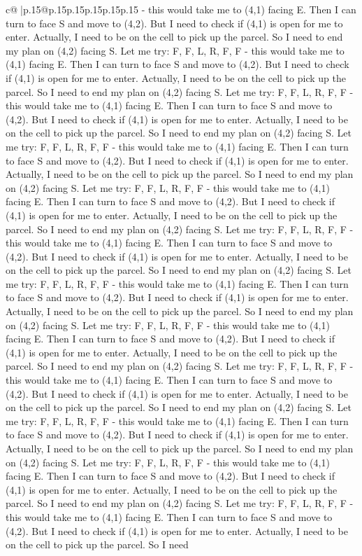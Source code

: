 \documentclass{article}
\begin{document}
{\begin{supertabular}{c@{$\;$}|p{.15\linewidth}@{}p{.15\linewidth}p{.15\linewidth}p{.15\linewidth}p{.15\linewidth}p{.15\linewidth}}
{{{{-} this would take me to (4,1) facing E. Then I can turn to face S and move to (4,2). But I need to check if (4,1) is open for me to enter. Actually, I need to be on the cell to pick up the parcel. So I need to end my plan on (4,2) facing S. Let me try: F, F, L, R, F, F {-} this would take me to (4,1) facing E. Then I can turn to face S and move to (4,2). But I need to check if (4,1) is open for me to enter. Actually, I need to be on the cell to pick up the parcel. So I need to end my plan on (4,2) facing S. Let me try: F, F, L, R, F, F {-} this would take me to (4,1) facing E. Then I can turn to face S and move to (4,2). But I need to check if (4,1) is open for me to enter. Actually, I need to be on the cell to pick up the parcel. So I need to end my plan on (4,2) facing S. Let me try: F, F, L, R, F, F {-} this would take me to (4,1) facing E. Then I can turn to face S and move to (4,2). But I need to check if (4,1) is open for me to enter. Actually, I need to be on the cell to pick up the parcel. So I need to end my plan on (4,2) facing S. Let me try: F, F, L, R, F, F {-} this would take me to (4,1) facing E. Then I can turn to face S and move to (4,2). But I need to check if (4,1) is open for me to enter. Actually, I need to be on the cell to pick up the parcel. So I need to end my plan on (4,2) facing S. Let me try: F, F, L, R, F, F {-} this would take me to (4,1) facing E. Then I can turn to face S and move to (4,2). But I need to check if (4,1) is open for me to enter. Actually, I need to be on the cell to pick up the parcel. So I need to end my plan on (4,2) facing S. Let me try: F, F, L, R, F, F {-} this would take me to (4,1) facing E. Then I can turn to face S and move to (4,2). But I need to check if (4,1) is open for me to enter. Actually, I need to be on the cell to pick up the parcel. So I need to end my plan on (4,2) facing S. Let me try: F, F, L, R, F, F {-} this would take me to (4,1) facing E. Then I can turn to face S and move to (4,2). But I need to check if (4,1) is open for me to enter. Actually, I need to be on the cell to pick up the parcel. So I need to end my plan on (4,2) facing S. Let me try: F, F, L, R, F, F {-} this would take me to (4,1) facing E. Then I can turn to face S and move to (4,2). But I need to check if (4,1) is open for me to enter. Actually, I need to be on the cell to pick up the parcel. So I need to end my plan on (4,2) facing S. Let me try: F, F, L, R, F, F {-} this would take me to (4,1) facing E. Then I can turn to face S and move to (4,2). But I need to check if (4,1) is open for me to enter. Actually, I need to be on the cell to pick up the parcel. So I need to end my plan on (4,2) facing S. Let me try: F, F, L, R, F, F {-} this would take me to (4,1) facing E. Then I can turn to face S and move to (4,2). But I need to check if (4,1) is open for me to enter. Actually, I need to be on the cell to pick up the parcel. So I need to end my plan on (4,2) facing S. Let me try: F, F, L, R, F, F {-} this would take me to (4,1) facing E. Then I can turn to face S and move to (4,2). But I need to check if (4,1) is open for me to enter. Actually, I need to be on the cell to pick up the parcel. So I need }}}
\end{supertabular}}
\end{document}
